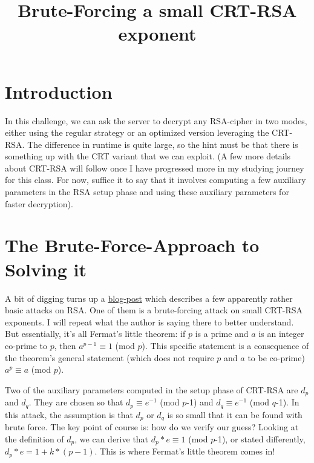 \documentclass{article}
\title{Brute-Forcing a small CRT-RSA exponent}
\begin{document}
\maketitle

\section{Introduction}

In this challenge, we can ask the server to decrypt any RSA-cipher in two modes, either using the regular strategy or an optimized version leveraging the CRT-RSA. The difference in runtime is quite large, so the hint must be that there is something up with the CRT variant that we can exploit. (A few more details about CRT-RSA will follow once I have progressed more in my studying journey for this class. For now, suffice it to say that it involves computing a few auxiliary parameters in the RSA setup phase and using these auxiliary parameters for faster decryption). 

\section{The Brute-Force-Approach to Solving it}

A bit of digging turns up a \href{https://bitsdeep.com/posts/attacking-rsa-for-fun-and-ctf-points-part-4/}{blog-post} which describes a few apparently rather basic attacks on RSA. One of them is a brute-forcing attack on small CRT-RSA exponents. I will repeat what the author is saying there to better understand. But essentially, it's all Fermat's little theorem: if $p$ is a prime and $a$ is an integer co-prime to $p$, then $a^{p-1} \equiv 1$ (mod $p$). This specific statement is a consequence of the theorem's general statement (which does not require $p$ and $a$ to be co-prime) $a^p \equiv a$ (mod $p$).

\medskip

Two of the auxiliary parameters computed in the setup phase of CRT-RSA are $d_p$ and $d_q$. They are chosen so that $d_p \equiv e^{-1}$ (mod $p$-1) and $d_q \equiv e^{-1}$ (mod $q$-1). In this attack, the assumption is that $d_p$ or $d_q$ is so small that it can be found with brute force. The key point of course is: how do we verify our guess? Looking at the definition of $d_p$, we can derive that $d_p*e \equiv 1$ (mod $p$-1), or stated differently, $d_p*e = 1+k*(p-1)$. This is where Fermat's little theorem comes in! 

\medskip
\end{document}
